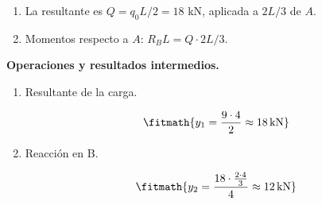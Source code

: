 \begin{enumerate}

\item La resultante es $Q = q_0 L/2 = 18$ kN, aplicada a $2L/3$ de $A$.

\item Momentos respecto a $A$: $R_B L = Q\cdot 2L/3$.

\end{enumerate}

\noindent\textbf{Operaciones y resultados intermedios.}

\begin{enumerate}

\item Resultante de la carga.

\[\fitmath{y_{1}=\frac{9\cdot 4}{2}\approx 18\,\mathrm{kN}}\]

\item Reacción en B.

\[\fitmath{y_{2}=\frac{18\cdot \frac{2\cdot 4}{3}}{4}\approx 12\,\mathrm{kN}}\]

\end{enumerate}
